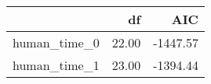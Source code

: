 \begin{table}[ht]
\centering
\begin{tabular}{rrr}
  \hline
 & df & AIC \\ 
  \hline
human\_time\_0 & 22.00 & -1447.57 \\ 
  human\_time\_1 & 23.00 & -1394.44 \\ 
   \hline
\end{tabular}
\end{table}

